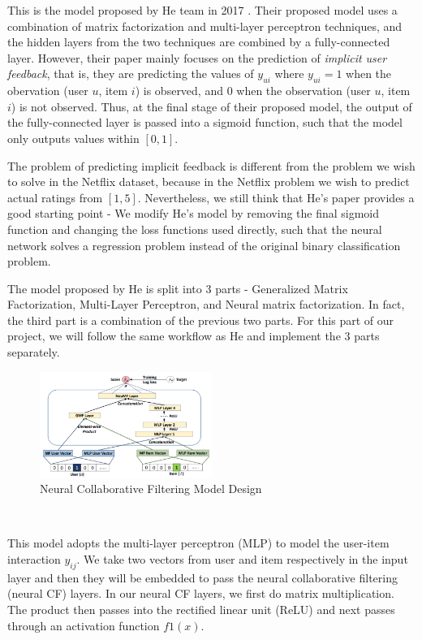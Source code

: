 \documentclass[final]{cvpr}
\begin{document}
This is the model proposed by He team in 2017 \cite{he2017neural}. Their proposed model uses a combination of matrix factorization and multi-layer perceptron techniques, and the hidden layers from the two techniques are combined by a fully-connected layer. However, their paper mainly focuses on the prediction of \textit{implicit user feedback}, that is, they are predicting the values of $y_{ui}$ where $y_{ui}=1$ when the obervation (user $u$, item $i$) is observed, and $0$ when the
observation (user $u$, item $i$) is not observed. Thus, at the final stage of their proposed model, the output of the fully-connected layer is passed into a sigmoid function, such that the model only outputs values within $[0, 1]$. 

The problem of predicting implicit feedback is different from the problem we wish to solve in the Netflix dataset, because in the Netflix problem we wish to predict actual ratings from $[1, 5]$.
Nevertheless, we still think that He's paper provides a good starting point - We modify He's model by removing the final sigmoid function and changing the loss functions used directly, such that the neural network solves a regression problem instead of the original binary
classification problem.

The model proposed by He is split into 3 parts - Generalized Matrix Factorization, Multi-Layer Perceptron, and Neural matrix factorization. In fact, the third part is a combination of the previous two parts. For this part of our project, we will follow the same workflow as He and implement the 3 parts separately. 

\begin{figure}[h]
	\includegraphics[width=0.5\textwidth]{./NeuCF.PNG}
	\caption{Neural Collaborative Filtering Model Design \cite{he2017neural}}
\end{figure}

\

This model adopts the multi-layer perceptron (MLP) to model the user-item interaction $y_{ij}$.
We take two vectors from user and item respectively in the input layer and then they will be embedded to pass the neural collaborative filtering (neural CF) layers. In our neural CF layers, we first do matrix multiplication. The product then passes into the rectified linear unit (ReLU) and next passes through an activation function $f1(x)$.
\end{document}

